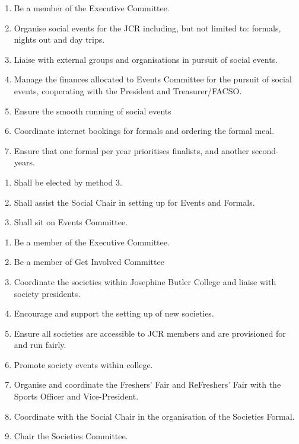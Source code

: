 \begin{enumerate}
    \item Be a member of the Executive Committee.
    \item Organise social events for the JCR including, but not limited to: formals, nights out and day trips.
    \item Liaise with external groups and organisations in pursuit of social events.
    \item Manage the finances allocated to Events Committee for the pursuit of social events, cooperating with the President and Treasurer/FACSO.
    \item Ensure the smooth running of social events
    \item Coordinate internet bookings for formals and ordering the formal meal.
    \item Ensure that one formal per year prioritises finalists, and another second-years.
\end{enumerate}

\begin{enumerate}
    \item Shall be elected by method 3.
    \item Shall assist the Social Chair in setting up for Events and Formals.
    \item Shall sit on Events Committee.
\end{enumerate}

\begin{enumerate}
    \item Be a member of the Executive Committee.
    \item Be a member of Get Involved Committee 
    \item Coordinate the societies within Josephine Butler College and liaise with society presidents.
    \item Encourage and support the setting up of new societies.
    \item Ensure all societies are accessible to JCR members and are provisioned for and run fairly.
    \item Promote society events within college.
    \item Organise and coordinate the Freshers' Fair and ReFreshers' Fair with the Sports Officer and Vice-President.
    \item Coordinate with the Social Chair in the organisation of the Societies Formal.
    \item Chair the Societies Committee.
\end{enumerate}


